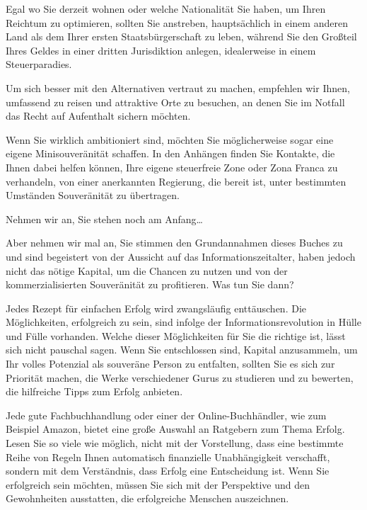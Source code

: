 \documentclass[
  a5paper,
  smalldemyvopaper,10pt,twoside,onecolumn,openright,extrafontsizes,hidelinks]{memoir}
\begin{document}
Egal wo Sie derzeit wohnen oder welche Nationalität Sie haben, um Ihren
Reichtum zu optimieren, sollten Sie anstreben, hauptsächlich in einem
anderen Land als dem Ihrer ersten Staatsbürgerschaft zu leben, während
Sie den Großteil Ihres Geldes in einer dritten Jurisdiktion anlegen,
idealerweise in einem Steuerparadies.

Um sich besser mit den Alternativen vertraut zu machen, empfehlen wir
Ihnen, umfassend zu reisen und attraktive Orte zu besuchen, an denen Sie
im Notfall das Recht auf Aufenthalt sichern möchten.

Wenn Sie wirklich ambitioniert sind, möchten Sie möglicherweise sogar
eine eigene Minisouveränität schaffen. In den Anhängen finden Sie
Kontakte, die Ihnen dabei helfen können, Ihre eigene steuerfreie Zone
oder Zona Franca zu verhandeln, von einer anerkannten Regierung, die
bereit ist, unter bestimmten Umständen Souveränität zu übertragen.

Nehmen wir an, Sie stehen noch am Anfang\ldots{}

Aber nehmen wir mal an, Sie stimmen den Grundannahmen dieses Buches zu
und sind begeistert von der Aussicht auf das Informationszeitalter,
haben jedoch nicht das nötige Kapital, um die Chancen zu nutzen und von
der kommerzialisierten Souveränität zu profitieren. Was tun Sie dann?

Jedes Rezept für einfachen Erfolg wird zwangsläufig enttäuschen. Die
Möglichkeiten, erfolgreich zu sein, sind infolge der
Informationsrevolution in Hülle und Fülle vorhanden. Welche dieser
Möglichkeiten für Sie die richtige ist, lässt sich nicht pauschal sagen.
Wenn Sie entschlossen sind, Kapital anzusammeln, um Ihr volles Potenzial
als souveräne Person zu entfalten, sollten Sie es sich zur Priorität
machen, die Werke verschiedener Gurus zu studieren und zu bewerten, die
hilfreiche Tipps zum Erfolg anbieten.

Jede gute Fachbuchhandlung oder einer der Online-Buchhändler, wie zum
Beispiel Amazon, bietet eine große Auswahl an Ratgebern zum Thema
Erfolg. Lesen Sie so viele wie möglich, nicht mit der Vorstellung, dass
eine bestimmte Reihe von Regeln Ihnen automatisch finanzielle
Unabhängigkeit verschafft, sondern mit dem Verständnis, dass Erfolg eine
Entscheidung ist. Wenn Sie erfolgreich sein möchten, müssen Sie sich mit
der Perspektive und den Gewohnheiten ausstatten, die erfolgreiche
Menschen auszeichnen.
\end{document}
